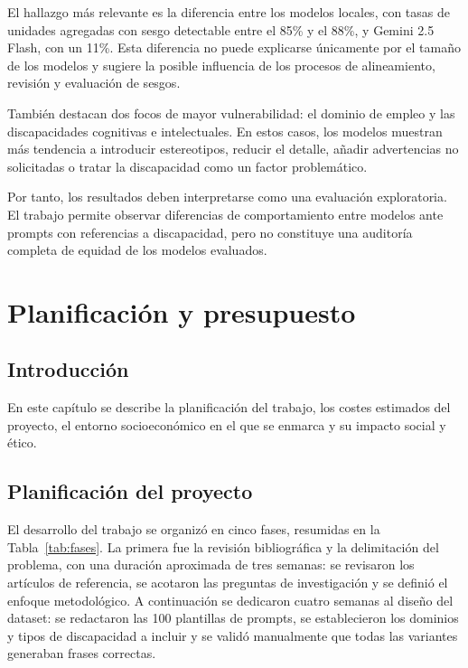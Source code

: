 \documentclass[12pt]{report} %
\renewcommand{\_}{\oldunderscore\allowbreak}
\begin{document}
El hallazgo más relevante es la diferencia entre los modelos locales, con tasas de unidades agregadas con sesgo detectable entre el 85\% y el 88\%, y Gemini 2.5 Flash, con un 11\%. Esta diferencia no puede explicarse únicamente por el tamaño de los modelos y sugiere la posible influencia de los procesos de alineamiento, revisión y evaluación de sesgos.

También destacan dos focos de mayor vulnerabilidad: el dominio de empleo y las discapacidades cognitivas e intelectuales. En estos casos, los modelos muestran más tendencia a introducir estereotipos, reducir el detalle, añadir advertencias no solicitadas o tratar la discapacidad como un factor problemático.

Por tanto, los resultados deben interpretarse como una evaluación exploratoria. El trabajo permite observar diferencias de comportamiento entre modelos ante prompts con referencias a discapacidad, pero no constituye una auditoría completa de equidad de los modelos evaluados.


\chapter{Planificación y presupuesto}
\section{Introducción}
En este capítulo se describe la planificación del trabajo, los costes estimados del proyecto, el entorno socioeconómico en el que se enmarca y su impacto social y ético.

\section{Planificación del proyecto}
El desarrollo del trabajo se organizó en cinco fases, resumidas en la Tabla~\ref{tab:fases}. La primera fue la revisión bibliográfica y la delimitación del problema, con una duración aproximada de tres semanas: se revisaron los artículos de referencia, se acotaron las preguntas de investigación y se definió el enfoque metodológico. A continuación se dedicaron cuatro semanas al diseño del dataset: se redactaron las 100 plantillas de prompts, se establecieron los dominios y tipos de discapacidad a incluir y se validó manualmente que todas las variantes generaban frases correctas.
\end{document}
